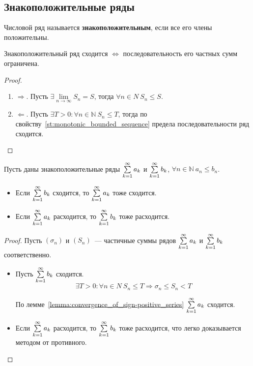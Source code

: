 \subsection{Знакоположительные ряды}
 Числовой ряд называется \textbf{знакоположительным}, если все его члены положительны.

\begin{lemma}
\label{lemma:convergence_of_sign-positive_series}
Знакоположительный ряд сходится $\Leftrightarrow$ последовательность его частных сумм ограничена.
\end{lemma}
\begin{proof}
\begin{enumerate}
	\item $\Rightarrow$. Пусть $\exists \lim\limits_{n \to \infty} S_n = S$, тогда $\forall n \in N \ S_n \leqslant S$.
	\item $\Leftarrow$. Пусть $\exists T > 0 \colon \forall n \in \mathbb N \ S_n \leqslant T$, тогда по свойству~\ref{st:monotonic_bounded_sequence} предела последовательности ряд сходится.
\end{enumerate}
\end{proof}

\begin{theorem}
Пусть даны знакоположительные ряды $\series a_k$ и $\series b_k$, $\forall n \in \mathbb N \ a_n \leqslant b_n$.
\begin{itemize}
	\item Если $\series b_k$ сходится, то $\series a_k$ тоже сходится.
	\item Если $\series a_k$ расходится, то $\series b_k$ тоже расходится.
\end{itemize}
\end{theorem}
\begin{proof}
Пусть $(\sigma_n)$ и $(S_n)$~--- частичные суммы рядов $\series a_k$ и $\series b_k$ соответственно.
\begin{itemize}
	\item Пусть $\series b_k$ сходится.
	\begin{equation*}
	\exists T > 0 \colon \forall n \in N \ S_n \leqslant T \Rightarrow
	\sigma_n \leqslant S_n < T
	\end{equation*}
	
	По лемме~\ref*{lemma:convergence_of_sign-positive_series} $\series a_k$ сходится.
	
	\item Если $\series a_k$ расходится, то $\series b_k$ тоже расходится, что легко доказывается методом от противного.
\end{itemize}
\end{proof}

